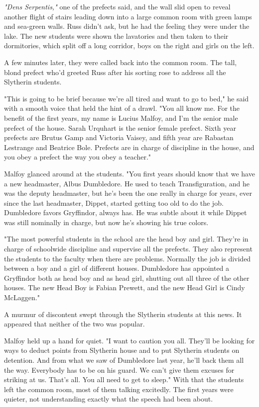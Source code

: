 \emph{"Dens Serpentis,"} one of the prefects said, and the wall slid open to reveal another flight of stairs leading down into a large common room with green lamps and sea-green walls. Russ didn't ask, but he had the feeling they were under the lake. The new students were shown the lavatories and then taken to their dormitories, which split off a long corridor, boys on the right and girls on the left.

A few minutes later, they were called back into the common room. The tall, blond prefect who'd greeted Russ after his sorting rose to address all the Slytherin students.

"This is going to be brief because we're all tired and want to go to bed," he said with a smooth voice that held the hint of a drawl. "You all know me. For the benefit of the first years, my name is Lucius Malfoy, and I'm the senior male prefect of the house. Sarah Urquhart is the senior female prefect. Sixth year prefects are Brutus Gamp and Victoria Vaisey, and fifth year are Rabastan Lestrange and Beatrice Bole. Prefects are in charge of discipline in the house, and you obey a prefect the way you obey a teacher."

Malfoy glanced around at the students. "You first years should know that we have a new headmaster, Albus Dumbledore. He used to teach Transfiguration, and he was the deputy headmaster, but he's been the one really in charge for years, ever since the last headmaster, Dippet, started getting too old to do the job. Dumbledore favors Gryffindor, always has. He was subtle about it while Dippet was still nominally in charge, but now he's showing his true colors.

"The most powerful students in the school are the head boy and girl. They're in charge of schoolwide discipline and supervise all the prefects. They also represent the students to the faculty when there are problems. Normally the job is divided between a boy and a girl of different houses. Dumbledore has appointed a Gryffindor both as head boy and as head girl, shutting out all three of the other houses. The new Head Boy is Fabian Prewett, and the new Head Girl is Cindy McLaggen."

A murmur of discontent swept through the Slytherin students at this news. It appeared that neither of the two was popular.

Malfoy held up a hand for quiet. "I want to caution you all. They'll be looking for ways to deduct points from Slytherin house and to put Slytherin students on detention. And from what we saw of Dumbledore last year, he'll back them all the way. Everybody has to be on his guard. We can't give them excuses for striking at us. That's all. You all need to get to sleep." With that the students left the common room, most of them talking excitedly. The first years were quieter, not understanding exactly what the speech had been about.

